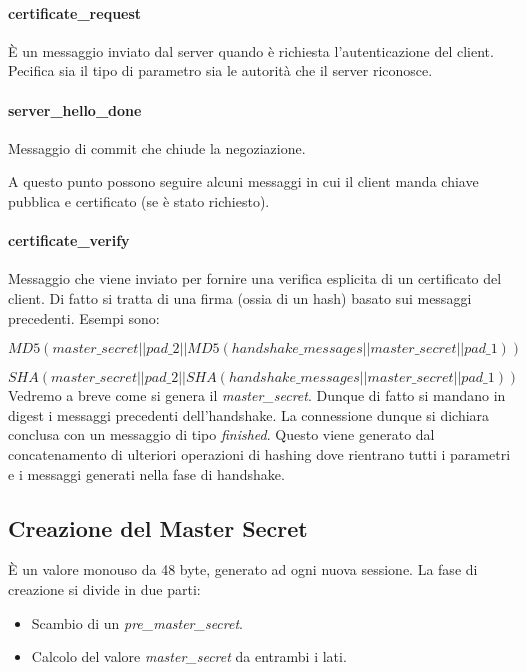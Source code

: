 \documentclass[14pt]{extreport}
\begin{document}
\paragraph{certificate\_request}
È un messaggio inviato dal server quando è richiesta l'autenticazione del client. Pecifica sia il tipo di parametro sia le autorità che il server riconosce.


\paragraph{server\_hello\_done}
Messaggio di commit che chiude la negoziazione.

A questo punto possono seguire alcuni messaggi in cui il client manda chiave pubblica e certificato (se è stato richiesto).


\paragraph{certificate\_verify}

Messaggio che viene inviato per fornire una verifica esplicita di un certificato del client. Di fatto si tratta di una firma (ossia di un hash) basato sui messaggi precedenti. Esempi sono:

$$
MD5(master\_secret || pad\_2 || MD5( handshake\_messages || master\_secret || pad\_1))
$$

$$
SHA(master\_secret || pad\_2 || SHA( handshake\_messages || master\_secret || pad\_1))
$$
Vedremo a breve come si genera il \textit{master\_secret}.
Dunque di fatto si mandano in digest i messaggi precedenti dell'handshake.
La connessione dunque si dichiara conclusa con un messaggio di tipo \textit{finished}. Questo viene generato dal concatenamento di ulteriori operazioni di hashing dove rientrano tutti i parametri e i messaggi generati nella fase di handshake.




\subsection{Creazione del Master Secret}

È un valore monouso da 48 byte, generato ad ogni nuova sessione. La fase di creazione si divide in due parti:


\begin{itemize}
    \item Scambio di un \textit{pre\_master\_secret}.
    
    \item Calcolo del valore \textit{master\_secret} da entrambi i lati.
\end{itemize}
\end{document}
